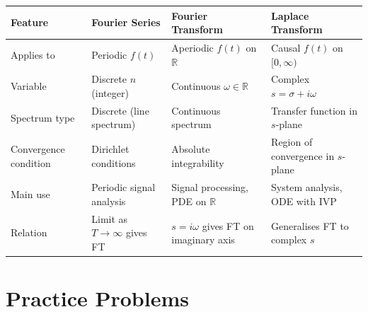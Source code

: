 \documentclass[12pt,a4paper]{article}
\begin{document}
\begin{enumerate}[label=\textbf{Q\arabic*.}, leftmargin=2.5em]
\begin{tabular}{@{} p{3.2cm} p{3.8cm} p{3.8cm} p{3.8cm} @{}}
\toprule
\textbf{Feature} & \textbf{Fourier Series} & \textbf{Fourier Transform} & \textbf{Laplace Transform} \\
\midrule
Applies to & Periodic $f(t)$ & Aperiodic $f(t)$ on $\mathbb{R}$ & Causal $f(t)$ on $[0,\infty)$ \\
\midrule
Variable & Discrete $n$ (integer) & Continuous $\omega \in \mathbb{R}$ & Complex $s = \sigma + i\omega$ \\
\midrule
Spectrum type & Discrete (line spectrum) & Continuous spectrum & Transfer function in $s$-plane \\
\midrule
Convergence condition & Dirichlet conditions & Absolute integrability & Region of convergence in $s$-plane \\
\midrule
Main use & Periodic signal analysis & Signal processing, PDE on $\mathbb{R}$ & System analysis, ODE with IVP \\
\midrule
Relation & Limit as $T\to\infty$ gives FT & $s = i\omega$ gives FT on imaginary axis & Generalises FT to complex $s$ \\
\bottomrule
\end{tabular}

\end{enumerate}

\section{Practice Problems}
\end{document}
